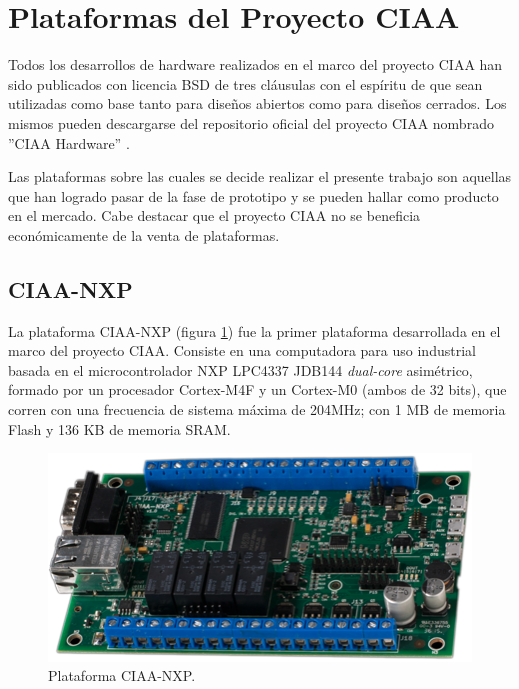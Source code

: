 \section{Plataformas del Proyecto CIAA}
\label{sec:ciaaBoards}

Todos los desarrollos de hardware realizados en el marco del proyecto CIAA han sido publicados con licencia BSD de tres cláusulas con el espíritu de que sean utilizadas como base tanto para diseños abiertos como para diseños cerrados. Los mismos pueden descargarse del repositorio oficial del proyecto CIAA nombrado ''CIAA Hardware'' \citep{ciaaHW}.

Las plataformas sobre las cuales se decide realizar el presente trabajo son aquellas que han logrado pasar de la fase de prototipo y se pueden hallar como producto en el mercado. Cabe destacar que el proyecto CIAA no se beneficia económicamente de la venta de plataformas.

\subsection{CIAA-NXP}

La plataforma CIAA-NXP (figura \ref{fig:ciaaNxp}) fue la primer plataforma desarrollada en el marco del proyecto CIAA. Consiste en una computadora para uso industrial basada en el microcontrolador NXP LPC4337 JDB144 \citep{LPC4337} \emph{dual-core} asimétrico, formado por un procesador Cortex-M4F y un Cortex-M0 (ambos de 32 bits), que corren con una frecuencia de sistema máxima de 204MHz; con 1 MB de memoria Flash y 136 KB de memoria SRAM.


\begin{figure}[!htbp]
\begin{center}  %
\includegraphics*[width=\textwidth]{Figures/CIAA-NXP_Foto.png}
\par\caption{Plataforma CIAA-NXP.}\label{fig:ciaaNxp}
\end{center}
\end{figure}

